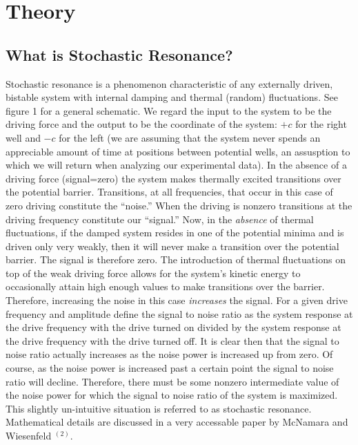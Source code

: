 \documentclass{report}
\begin{document}
\chapter{Theory}

\section{What is Stochastic Resonance?}

Stochastic resonance is a phenomenon characteristic of any externally driven, bistable system with internal damping and thermal (random) fluctuations. See figure 1 for a general schematic. We regard the input to the system to be the driving force and the output to be the coordinate of the system: $+c$ for the right well and $-c$ for the left (we are assuming that the system never spends an appreciable amount of time at positions between potential wells, an assusption to which we will return when analyzing our experimental data). In the absence of a driving force (signal=zero) the system makes thermally excited transitions over the potential barrier. Transitions, at all frequencies, that occur in this case of zero driving constitute the ``noise.'' When the driving is nonzero transitions at the driving frequency constitute our ``signal.'' Now, in the \emph{absence} of thermal fluctuations, if the damped system resides in one of the potential minima and is driven only very weakly, then it will never make a transition over the potential barrier. The signal is therefore zero. The introduction of thermal fluctuations on top of the weak driving force allows for the system's kinetic energy to occasionally attain high enough values to make transitions over the barrier. Therefore, increasing the noise in this case \emph{increases} the signal. For a given drive frequency and amplitude define the signal to noise ratio as the system response at the drive frequency with the drive turned on divided by the system response at the drive frequency with the drive turned off. It is clear then that the signal to noise ratio actually increases as the noise power is increased up from zero. Of course, as the noise power is increased past a certain point the signal to noise ratio will decline. Therefore, there must be some nonzero intermediate value of the noise power for which the signal to noise ratio of the system is maximized. This slightly un-intuitive situation is referred to as stochastic resonance. Mathematical details are discussed in a very accessable paper by McNamara and Wiesenfeld $^{(2)}$.
\end{document}

